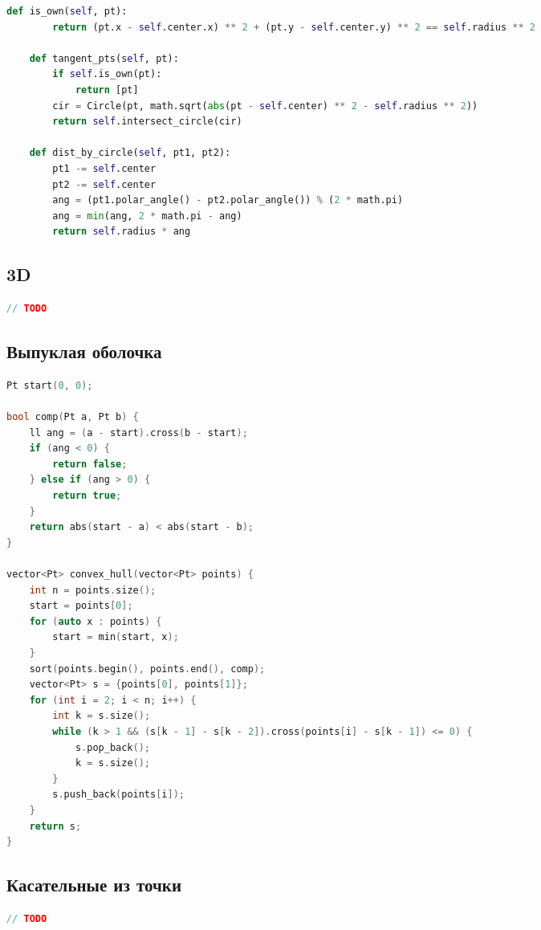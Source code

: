 \documentclass[10pt,a4paper,landscape,twosided]{extarticle}
\begin{document}
\begin{multicols}{3}
\begin{lstlisting}[language=Python]
    def is_own(self, pt):
        return (pt.x - self.center.x) ** 2 + (pt.y - self.center.y) ** 2 == self.radius ** 2

    def tangent_pts(self, pt):
        if self.is_own(pt):
            return [pt]
        cir = Circle(pt, math.sqrt(abs(pt - self.center) ** 2 - self.radius ** 2))
        return self.intersect_circle(cir)

    def dist_by_circle(self, pt1, pt2):
        pt1 -= self.center
        pt2 -= self.center
        ang = (pt1.polar_angle() - pt2.polar_angle()) % (2 * math.pi)
        ang = min(ang, 2 * math.pi - ang)
        return self.radius * ang


\end{lstlisting}

\subsection{3D}
\begin{lstlisting}[language=C++]
// TODO

\end{lstlisting}

\subsection{Выпуклая оболочка}
\begin{lstlisting}[language=C++]
Pt start(0, 0);

bool comp(Pt a, Pt b) {
    ll ang = (a - start).cross(b - start);
    if (ang < 0) {
        return false;
    } else if (ang > 0) {
        return true;
    }
    return abs(start - a) < abs(start - b);
}

vector<Pt> convex_hull(vector<Pt> points) {
    int n = points.size();
    start = points[0];
    for (auto x : points) {
        start = min(start, x);
    }
    sort(points.begin(), points.end(), comp);
    vector<Pt> s = {points[0], points[1]};
    for (int i = 2; i < n; i++) {
        int k = s.size();
        while (k > 1 && (s[k - 1] - s[k - 2]).cross(points[i] - s[k - 1]) <= 0) {
            s.pop_back();
            k = s.size();
        }
        s.push_back(points[i]);
    }
    return s;
}


\end{lstlisting}

\subsection{Касательные из точки}
\begin{lstlisting}[language=C++]
// TODO


\end{lstlisting}
\end{multicols}
\end{document}
